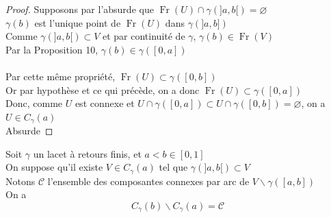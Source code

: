 \documentclass{article}
\begin{document}
\begin{flushleft}
\begin{proof}
    Supposons par l'absurde que $\operatorname{Fr}(U) \cap \gamma(]a, b[) = \varnothing$\\
    $\gamma(b)$ est l'unique point de $\operatorname{Fr}(U)$ dans $\gamma(]a, b])$\\
    Comme $\gamma(]a, b[) \subset V$ et par continuité de $\gamma$, $\gamma(b) \in \operatorname{Fr}(V)$\\
    Par la Proposition 10, $\gamma(b) \in \gamma([0, a])$
    \\~\\
    Par cette même propriété, $\operatorname{Fr}(U) \subset \gamma([0, b])$\\
    Or par hypothèse et ce qui précède, on a donc $\operatorname{Fr}(U) \subset \gamma([0, a])$\\
    Donc, comme $U$ est connexe et $U \cap \gamma([0, a]) \subset U \cap \gamma([0, b]) = \varnothing$, on a $U \in C_{\gamma}(a)$\\
    Absurde
\end{proof}

\begin{tcolorbox}[colback = purple!20!white, colframe = purple!60!white, title = Lemme d'apparition]
    Soit $\gamma$ un lacet à retours finis, et $a < b \in [0, 1]$\\
    On suppose qu'il existe $V \in C_{\gamma}(a)$ tel que $\gamma(]a, b[) \subset V$\\
    Notons $\mathcal{C}$ l'ensemble des composantes connexes par arc de $V \backslash \gamma([a, b])$\\
    On a
    \[ C_{\gamma}(b) \backslash C_{\gamma}(a) = \mathcal{C}\]
\end{tcolorbox}


\end{flushleft}
\end{document}
